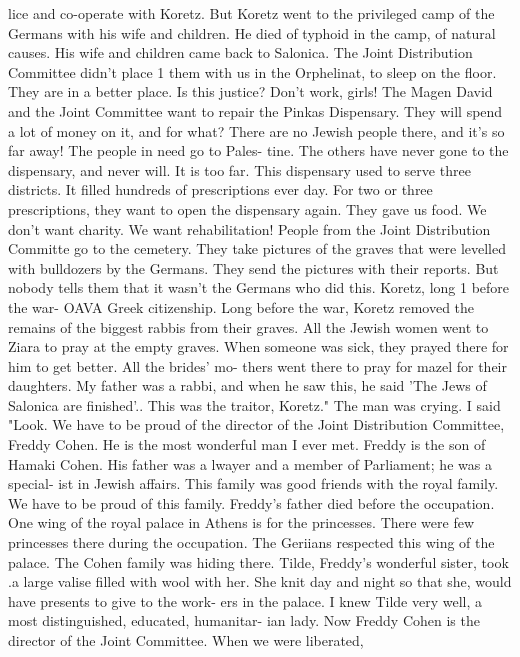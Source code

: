 lice and co-operate with Koretz. But Koretz went to the privileged camp of the Germans 
with his wife and children. He died of typhoid in the camp, of natural causes. His 
wife and children came back to Salonica. The Joint Distribution Committee didn't place 1 
them with us in the Orphelinat, to sleep on the floor. They are in a better place. 
Is this justice? Don't work, girls! The Magen David and the Joint Committee want to 
repair the Pinkas Dispensary. They will spend a lot of money on it, and for what? 
There are no Jewish people there, and it's so far away! The people in need go to Pales-
tine. The others have never gone to the dispensary, and never will. It is too far. 
This dispensary used to serve three districts. It filled hundreds of prescriptions ever 
day. For two or three prescriptions, they want to open the dispensary again. 
They gave us food. We don't want charity. We want rehabilitation! People from 
the Joint Distribution Committe go to the cemetery. They take pictures of the graves 
that were levelled with bulldozers by the Germans. They send the pictures with their 
reports. But nobody tells them that it wasn't the Germans who did this. Koretz, long 
1 
before the war- OAVA 
Greek citizenship. Long before the war, Koretz removed the remains of the biggest 
rabbis from their graves. All the Jewish women went to Ziara to pray at the empty graves. 
When someone was sick, they prayed there for him to get better. All the brides' mo-
thers went there to pray for mazel for their daughters. My father was a rabbi, and when 
he saw this, he said 'The Jews of Salonica are finished'.. This was the traitor, 
Koretz." The man was crying. 
I said "Look. We have to be proud of the director of the Joint Distribution 
Committee, Freddy Cohen. He is the most wonderful man I ever met. Freddy is the son 
of Hamaki Cohen. His father was a lwayer and a member of Parliament; he was a special-
ist in Jewish affairs. This family was good friends with the royal family. We have to 
be proud of this family. Freddy's father died before the occupation. One wing of the 
royal palace in Athens is for the princesses. There were few princesses there during 
the occupation. The Geriians respected this wing of the palace. The Cohen family was 
hiding there. Tilde, Freddy's wonderful sister, took .a large valise filled with wool 
with her. She knit day and night so that she, would have presents to give to the work-
ers in the palace. I knew Tilde very well, a most distinguished, educated, humanitar-
ian lady. 
Now Freddy Cohen is the director of the Joint Committee. When we were liberated, 
